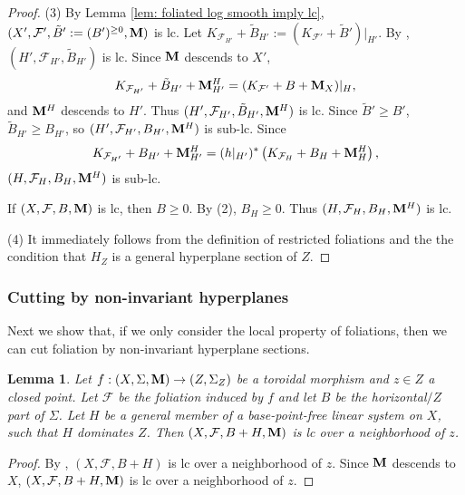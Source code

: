 \documentclass[11pt]{amsart}
\numberwithin{equation}{section}
\newcommand{\Mm}{{\bf{M}}}
\newcommand{\Ff}{\mathcal{F}}
\newtheorem{lem}[thm]{Lemma}
\theoremstyle{definition}
\theoremstyle{definition}
\theoremstyle{definition}
\begin{document}
\begin{proof}
(3) By Lemma \ref{lem: foliated log smooth imply lc}, $(X',\Ff',\tilde B':=(B')^{\geq 0},\Mm)$ is lc. Let $K_{\Ff_{H'}}+\tilde B_{H'}:=(K_{\Ff'}+\tilde B')|_{H'}$. By \cite[Proposition 3.2]{ACSS21}, $(H',\Ff_{H'},\tilde B_{H'})$ is lc. Since $\Mm$ descends to $X'$, 
$$K_{\Ff_{H'}}+\tilde B_{H'}+\Mm^H_{H'}=(K_{\Ff'}+B+\Mm_X)|_H,$$
and $\Mm^H$ descends to $H'$. Thus $(H',\Ff_{H'},\tilde B_{H'},\Mm^H)$ is lc. Since $\tilde B'\geq B'$, $\tilde B_{H'}\geq B_{H'}$, so $(H',\Ff_{H'},B_{H'},\Mm^H)$ is sub-lc. Since
$$K_{\Ff_{H'}}+B_{H'}+\Mm^H_{H'}=(h|_{H'})^*\left(K_{\Ff_H}+B_H+\Mm^H_H\right),$$
$(H,\Ff_H,B_H,\Mm^H)$ is sub-lc. 

If $(X,\Ff,B,\Mm)$ is lc, then $B\geq 0$. By (2), $B_H\geq 0$. Thus $(H,\Ff_H,B_H,\Mm^H)$ is lc.

(4) It immediately follows from the definition of restricted foliations and the the condition that $H_Z$ is a general hyperplane section of $Z$.
\end{proof}


\subsubsection{Cutting by non-invariant hyperplanes}

Next we show that, if we only consider the local property of foliations, then we can cut foliation by non-invariant hyperplane sections. 

\begin{lem}\label{lem: toroidal cut general hyperplane still lc}
    Let $f: (X,\Sigma,\Mm)\rightarrow (Z,\Sigma_Z)$ be a toroidal morphism and $z\in Z$ a closed point. Let $\Ff$ be the foliation induced by $f$ and let $B$ be the horizontal$/Z$ part of $\Sigma$. Let $H$ be a general member of a base-point-free linear system on $X$, such that $H$ dominates $Z$.  Then $(X,\Ff,B+H,\Mm)$ is lc over a neighborhood of $z$.
\end{lem}
\begin{proof}
By \cite[Lemma 3.6]{DLM23}, $(X,\Ff,B+H)$ is lc over a neighborhood of $z$. Since $\Mm$ descends to $X$, $(X,\Ff,B+H,\Mm)$ is lc over a neighborhood of $z$.
\end{proof}
\end{document}
